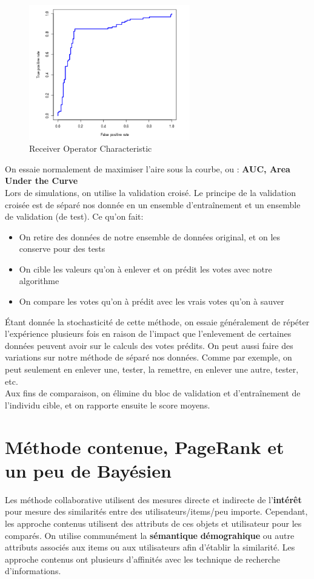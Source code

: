 \documentclass[oneside]{book}
\begin{document}
\begin{figure}[!ht]
\centering
\includegraphics[width = 7cm]{ROC.png}
\caption{Receiver Operator Characteristic}
\label{fig:ROC}
\end{figure}

On essaie normalement de maximiser l'aire sous la courbe, ou : \textbf{AUC, Area Under the Curve}\\

Lors de simulations, on utilise la validation croisé. Le principe de la validation croisée est de séparé nos donnée en un ensemble d'entraînement et un ensemble de validation (de test). Ce qu'on fait:
\begin{itemize}
\item On retire des données de notre ensemble de données original, et on les conserve pour des tests
\item On cible les valeurs qu'on à enlever et on prédit les votes avec notre algorithme
\item On compare les votes qu'on à prédit avec les vrais votes qu'on à sauver
\end{itemize}

Étant donnée la stochasticité de cette méthode, on essaie généralement de répéter l'expérience plusieurs fois en raison de l'impact que l'enlevement de certaines données peuvent avoir sur le calculs des votes prédits. On peut aussi faire des variations sur notre méthode de séparé nos données. Comme par exemple, on peut seulement en enlever une, tester, la remettre, en enlever une autre, tester, etc.\\

Aux fins de comparaison, on élimine du bloc de validation et d'entraînement de l'individu cible, et on rapporte ensuite le score moyens. 

\chapter{Méthode contenue, PageRank et un peu de Bayésien}
Les méthode collaborative utilisent des mesures directe et indirecte de l'\textbf{intérêt} pour mesure des similarités entre des utilisateurs/items/peu importe. Cependant, les approche contenus utilisent des attributs de ces objets et utilisateur pour les comparés. On utilise communément la \textbf{sémantique} \textbf{démograhique} ou autre attributs associés aux items ou aux utilisateurs afin d'établir la similarité. Les approche contenus ont plusieurs d'affinités avec les technique de recherche d'informations.\\
\end{document}
